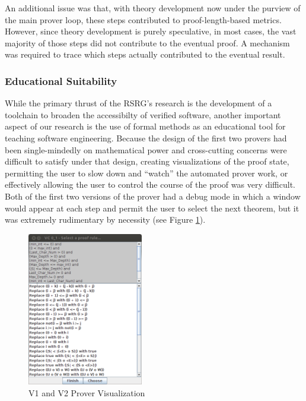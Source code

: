 An additional issue was that, with theory development now under the purview of the main prover loop, these steps contributed to proof-length-based metrics.  However, since theory development is purely speculative, in most cases, the vast majority of those steps did not contribute to the eventual proof.  A mechanism was required to trace which steps actually contributed to the eventual result.

		\subsubsection{Educational Suitability}

While the primary thrust of the RSRG's research is the development of a toolchain to broaden the accessibilty of verified software, another important aspect of our research is the use of formal methods as an educational tool for teaching software engineering.  Because the design of the first two provers had been single-mindedly on mathematical power and cross-cutting concerns were difficult to satisfy under that design, creating visualizations of the proof state, permitting the user to slow down and ``watch'' the automated prover work, or effectively allowing the user to control the course of the proof was very difficult.  Both of the first two versions of the prover had a debug mode in which a window would appear at each step and permit the user to select the next theorem, but it was extremely rudimentary by necessity (see Figure \ref{proverDebugMode}).

\begin{figure}
  \centering
    \includegraphics[width=0.45\textwidth]{proverDebugMode}
  \caption{V1 and V2 Prover Visualization\label{proverDebugMode}}
\end{figure}

